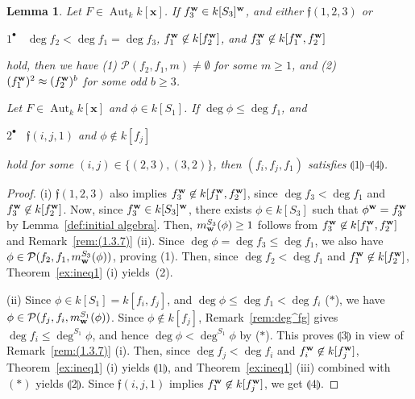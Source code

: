 \documentclass{amsart}
\theoremstyle{plain}
\newtheorem{lem}[thm]{Lemma}
\theoremstyle{definition}
\newcommand{\Aut }{\mathop{\mathrm{Aut}}\nolimits}
\newcommand{\nd}{\noindent}
\newcommand{\x}{{\boldsymbol x}}
\newcommand{\w}{{\bf w}}
\newcommand{\kx}{k[\x]}
\begin{document}
\begin{lem}\label{exc:ineq1}\rm
\nd {\rm (i)} 
Let $F\in \Aut _k\kx $. 
If $f_3^{\w }\in k[S_3]^{\w }$, 
and either $\mathfrak{f}(1,2,3)$ or 



$1^\bullet $ \ 
$\deg f_2<\deg f_1=\deg f_3$, 
$f_1^{\w }\not\in k[f_2^{\w }]$, 
and $f_3^{\w }\not\in k[f_1^{\w },f_2^{\w }]$ 


\nd 
hold, 
then we have 
(1) $\mathcal{P}(f_2,f_1,m)\ne \emptyset $ for some $m\ge 1$, 
and (2) $(f_1^{\w })^2\approx (f_2^{\w })^b$ for some odd $b\ge 3$. 



\nd{\rm (ii)} 
Let $F\in \Aut _k\kx $ and $\phi \in k[S_1]$. 
If $\deg \phi \le \deg f_1$, and 

$2^\bullet $ \ 
$\mathfrak{f}(i,j,1)$ and $\phi \not\in k[f_j]$ 


\nd 
hold for some $(i,j)\in \{ (2,3),(3,2)\} $, 
then $(f_i,f_j,f_1)$ satisfies 
$\llparenthesis 1 \rrparenthesis$--$\llparenthesis 4 \rrparenthesis$. 
\end{lem}


\begin{proof}
(i) 
$\mathfrak{f}(1,2,3)$ also implies 
$f_3^{\w }\not\in k[f_1^{\w },f_2^{\w }]$, 
since $\deg f_3<\deg f_1$ and $f_3^{\w }\not\in k[f_2^{\w }]$. 
Now, 
since $f_3^{\w }\in k[S_3]^{\w }$, 
there exists 
$\phi \in k[S_3]$ such that 
$\phi ^{\w }=f_3^{\w }$ 
by Lemma~\ref{def:initial algebra}. 
Then, 
$m_{\w }^{S_3}(\phi )\ge 1$ 
follows from $f_3^{\w }\not\in k[f_1^{\w },f_2^{\w }]$ and 
Remark~\ref{rem:(1.3.7)} (ii). 
Since $\deg \phi =\deg f_3\le \deg f_1$, 
we also have $\phi \in \mathcal{P}(f_2,f_1,m_{\w }^{S_3}(\phi ))$, 
proving (1). 
Then, 
since $\deg f_2<\deg f_1$ and $f_1^{\w }\not\in k[f_2^{\w }]$, 
Theorem~\ref{ex:ineq1} (i) yields~(2). 


(ii) 
Since $\phi \in k[S_1]=k[f_i,f_j]$, and 
$\deg \phi \le \deg f_1<\deg f_i$ ($*$), 
we have $\phi \in \mathcal{P}(f_j,f_i,m_{\w }^{S_1}(\phi ))$. 
Since $\phi \not\in k[f_j]$, 
Remark~\ref{rem:deg^fg} gives $\deg f_i\le \deg ^{S_1}\phi $, 
and hence $\deg \phi <\deg ^{S_1}\phi $ by ($*$). 
This proves $\llparenthesis 3 \rrparenthesis$ 
in view of Remark~\ref{rem:(1.3.7)} (i). 
Then, 
since $\deg f_j<\deg f_i$ and $f_i^{\w }\not\in k[f_j^{\w }]$, 
Theorem~\ref{ex:ineq1} (i) yields $\llparenthesis 1 \rrparenthesis$, 
and Theorem~\ref{ex:ineq1} (iii) combined with $(*)$ yields 
$\llparenthesis 2 \rrparenthesis$. 
Since $\mathfrak{f}(i,j,1)$ implies $f_1^{\w }\not\in k[f_j^{\w }]$, 
we get 
$\llparenthesis 4 \rrparenthesis$. 
\end{proof}
\end{document}
